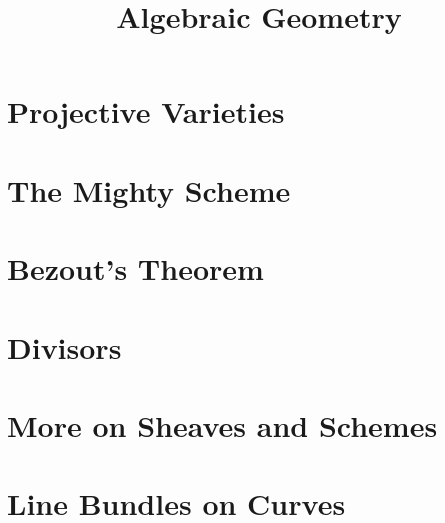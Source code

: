 \documentclass[11pt]{scrreprt}
\begin{document}
\title{Algebraic Geometry}
\maketitle

\chapter{Projective Varieties}

\chapter{The Mighty Scheme}
\chapter{Bezout's Theorem}
\chapter{Divisors}
\chapter{More on Sheaves and Schemes}
\chapter{Line Bundles on Curves}
\end{document}
